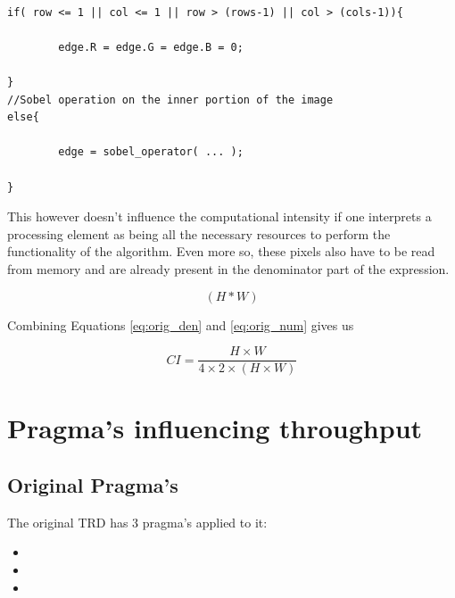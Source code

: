 \begin{lstlisting}[caption=Sobel Code Snippet, captionpos=b, label=lst:sobelpix]

if( row <= 1 || col <= 1 || row > (rows-1) || col > (cols-1)){
		
		edge.R = edge.G = edge.B = 0;
		
}
//Sobel operation on the inner portion of the image
else{

		edge = sobel_operator( ... );
		
}

\end{lstlisting}

This however doesn't influence the computational intensity if one interprets a processing element as being all the necessary resources to perform the functionality of the algorithm. Even more so, these pixels also have to be read from memory and are already present in the denominator part of the expression.


\begin{equation} \label{eq:orig_num}
( H * W )
\end{equation}

\medskip
Combining Equations \ref{eq:orig_den} and \ref{eq:orig_num} gives us
\medskip

\begin{equation}
CI = \frac{H \times W}{4 \times 2 \times ( H \times W )}
\end{equation}




\section{Pragma's influencing throughput}

\subsection{Original Pragma's}
\label{sec:original_pragma}

The original TRD has 3 pragma's applied to it:

\begin{itemize}
\item {}
\item {}
\item {}
\end{itemize}



